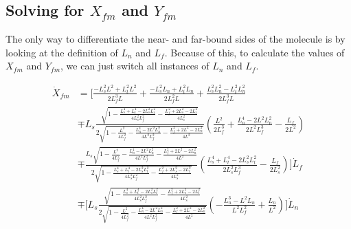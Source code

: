 \documentclass[11pt, landscape]{article}
\begin{document}
\subsection{Solving for $X_{fm}$ and $Y_{fm}$}
The only way to differentiate the near- and far-bound sides of the molecule is by looking at the definition of $L_n$ and $L_f$. Because of this, to calculate the values of $X_{fm}$ and $Y_{fm}$, we can just switch all instances of $L_n$ and $L_f$.

\begin{align}
  \dot{X}_{fm} &= \Bigg[\frac{-L_s^2L^2 + L_t^2L^2}{2L_f^3L} + \frac{-L_s^2L_n + L_t^2L_n}{2L_f^2L} + \frac{L_s^2L_n^2 - L_t^2L_n^2}{2L_f^3L}\\
  &\mp L_s\frac{\sqrt{1 - \frac{L_s^4 + L_t^4 - 2L_s^2L_t^2}{4L_{s}^2L_f^2} - \frac{L_f^2 + 2L_s^2 - 2L_t^2}{4L_s^2}}}{2\sqrt{1 - \frac{L^2}{4L_f^2} - \frac{L_n^4 - 2L^2L_n^2}{4L^2L_f^2} - \frac{L_f^2 + 2L^2 - 2L_n^2}{4L^2}}}\left(\frac{L^2}{2L_f^3} + \frac{L_n^4 - 2L^2L_n^2}{2L^2L_f^3} - \frac{L_f}{2L^2}\right)\\
  &\mp \frac{L_s\sqrt{1 - \frac{L^2}{4L_f^2} - \frac{L_n^4 - 2L^2L_n^2}{4L^2L_f^2} - \frac{L_f^2 + 2L^2 - 2L_n^2}{4L^2}}}{2\sqrt{1 - \frac{L_s^4 + L_t^4 - 2L_s^2L_t^2}{4L_{s}^2L_f^2} - \frac{L_f^2 + 2L_s^2 - 2L_t^2}{4L_s^2}}}
  \left(\frac{L_s^4 + L_t^4 - 2L_s^2L_t^2}{2L_{s}^2L_f^3} - \frac{L_f}{2L_s^2}\right)\Bigg]\dot{L}_f\\
  &\mp \Bigg[L_s\frac{\sqrt{1 - \frac{L_s^4 + L_t^4 - 2L_s^2L_t^2}{4L_{s}^2L_f^2} - \frac{L_f^2 + 2L_s^2 - 2L_t^2}{4L_s^2}}}{2\sqrt{1 - \frac{L^2}{4L_f^2} - \frac{L_n^4 - 2L^2L_n^2}{4L^2L_f^2} - \frac{L_f^2 + 2L^2 - 2L_n^2}{4L^2}}}\left(-\frac{L_n^3 - L^2L_n}{L^2L_f^2} + \frac{L_n}{L^2}\right)\Bigg]\dot{L}_n\\
\end{align}
\end{document}
